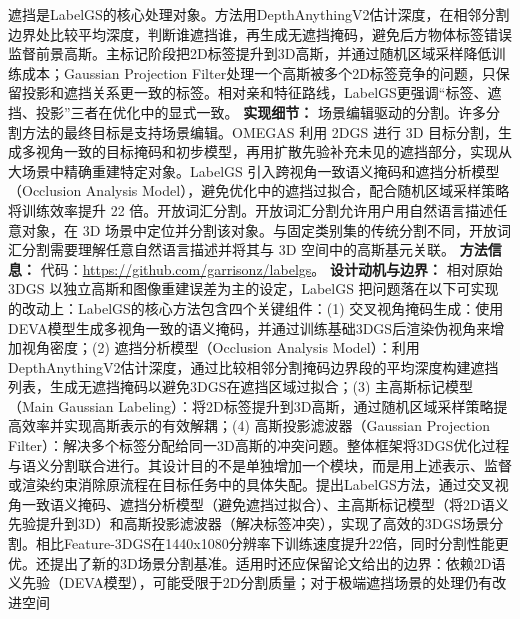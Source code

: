 遮挡是LabelGS的核心处理对象。方法用DepthAnythingV2估计深度，在相邻分割边界处比较平均深度，判断谁遮挡谁，再生成无遮挡掩码，避免后方物体标签错误监督前景高斯。主标记阶段把2D标签提升到3D高斯，并通过随机区域采样降低训练成本；Gaussian Projection Filter处理一个高斯被多个2D标签竞争的问题，只保留投影和遮挡关系更一致的标签。相对亲和特征路线，LabelGS更强调“标签、遮挡、投影”三者在优化中的显式一致。
\textbf{实现细节：} 场景编辑驱动的分割。许多分割方法的最终目标是支持场景编辑。OMEGAS 利用 2DGS 进行 3D 目标分割，生成多视角一致的目标掩码和初步模型，再用扩散先验补充未见的遮挡部分，实现从大场景中精确重建特定对象。LabelGS 引入跨视角一致语义掩码和遮挡分析模型（Occlusion Analysis Model），避免优化中的遮挡过拟合，配合随机区域采样策略将训练效率提升 22 倍。开放词汇分割。开放词汇分割允许用户用自然语言描述任意对象，在 3D 场景中定位并分割该对象。与固定类别集的传统分割不同，开放词汇分割需要理解任意自然语言描述并将其与 3D 空间中的高斯基元关联。
\textbf{方法信息：} 代码：\url{https://github.com/garrisonz/labelgs}。
\textbf{设计动机与边界：} 相对原始 3DGS 以独立高斯和图像重建误差为主的设定，LabelGS 把问题落在以下可实现的改动上：LabelGS的核心方法包含四个关键组件：(1) 交叉视角掩码生成：使用DEVA模型生成多视角一致的语义掩码，并通过训练基础3DGS后渲染伪视角来增加视角密度；(2) 遮挡分析模型（Occlusion Analysis Model）：利用DepthAnythingV2估计深度，通过比较相邻分割掩码边界段的平均深度构建遮挡列表，生成无遮挡掩码以避免3DGS在遮挡区域过拟合；(3) 主高斯标记模型（Main Gaussian Labeling）：将2D标签提升到3D高斯，通过随机区域采样策略提高效率并实现高斯表示的有效解耦；(4) 高斯投影滤波器（Gaussian Projection Filter）：解决多个标签分配给同一3D高斯的冲突问题。整体框架将3DGS优化过程与语义分割联合进行。其设计目的不是单独增加一个模块，而是用上述表示、监督或渲染约束消除原流程在目标任务中的具体失配。提出LabelGS方法，通过交叉视角一致语义掩码、遮挡分析模型（避免遮挡过拟合）、主高斯标记模型（将2D语义先验提升到3D）和高斯投影滤波器（解决标签冲突），实现了高效的3DGS场景分割。相比Feature-3DGS在1440x1080分辨率下训练速度提升22倍，同时分割性能更优。还提出了新的3D场景分割基准。适用时还应保留论文给出的边界：依赖2D语义先验（DEVA模型），可能受限于2D分割质量；对于极端遮挡场景的处理仍有改进空间
